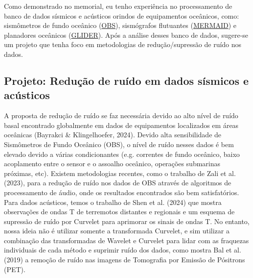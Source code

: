 \documentclass[10pt,a4paper,oneside]{book}
\begin{document}
Como demonstrado no memorial, eu tenho experiência no processamento de banco de dados sísmicos e acústicos orindos de equipamentos oceânicos, como: sismômetros de fundo oceânico (\href{https://en.wikipedia.org/wiki/Ocean-bottom_seismometer}{OBS}), sismógrafos flutuantes (\href{https://www.geoazur.fr/GLOBALSEIS/Mermaid.html}{MERMAID}) e planadores oceânicos (\href{https://oceanservice.noaa.gov/facts/ocean-gliders.html}{GLIDER}). Após a análise desses banco de dados, sugere-se um projeto que tenha foco em metodologias de redução/supressão de ruído nos dados.

\subsection{Projeto: Redução de ruído em dados sísmicos e acústicos}

A proposta de redução de ruído se faz necessária devido ao alto nível de ruído basal encontrado globalmente em dados de equipamentos localizados em áreas oceânicas (Bayrakci \& Klingelhoefer, 2024). Devido alta sensibilidade de Sismômetros de Fundo Oceânico (OBS), o nível de ruído nesses dados é bem elevado devido a várias condicionantes (e.g. correntes de fundo oceânico, baixo acoplamento entre o sensor e o assoalho oceânico, operações submarinas próximas, etc). Existem metodologias recentes, como o trabalho de Zali et al. (2023), para a redução de ruído nos dados de OBS através de algoritmos de processamento de áudio, onde os resultados encontrados são bem satisfatórios. Para dados acústicos, temos o trabalho de Shen et al. (2024) que mostra observações de ondas T de terremotos distantes e regionais e um esquema de supressão de ruído por Curvelet para aprimorar os sinais de ondas T. No entanto, nossa ideia não é utilizar somente a transformada Curvelet, e sim utilizar a combinação das transformadas de Wavelet e Curvelet para lidar com as fraquezas individuais de cada método e suprimir ruído dos dados, como mostra Bal et al.(2019) a remoção de ruído nas imagens de Tomografia por Emissão de Pósitrons (PET).
\end{document}
